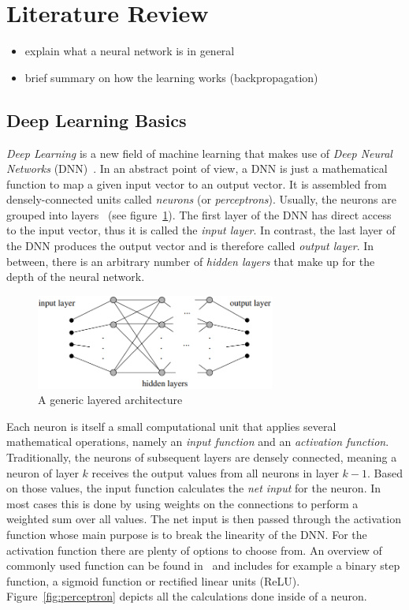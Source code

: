 \section{Literature Review}
\begin{itemize}
    \item explain what a neural network is in general
    \item brief summary on how the learning works (backpropagation)
\end{itemize}

\subsection{Deep Learning Basics}
\emph{Deep Learning} is a new field of machine learning that makes use of \emph{Deep Neural Networks} (DNN)~\cite[pp.~125f]{nn_intro96}. In an abstract point of view, a DNN is just a mathematical function to map a given input vector to an output vector. It is assembled from densely-connected units called \emph{neurons} (or \emph{perceptrons}). Usually, the neurons are grouped into layers~\cite[p.~125]{nn_intro96} (see figure~\ref{fig:layered_architecture}). The first layer of the DNN has direct access to the input vector, thus it is called the \emph{input layer}. In contrast, the last layer of the DNN produces the output vector and is therefore called \emph{output layer}. In between, there is an arbitrary number of \emph{hidden layers} that make up for the depth of the neural network.

\begin{figure}[h]
    \centering
    \includegraphics[width=0.7\textwidth]{images/generic_layered_architecture}
    \caption{A generic layered architecture~\cite[p.~126]{nn_intro96}}
    \label{fig:layered_architecture}
\end{figure}

Each neuron is itself a small computational unit that applies several mathematical operations, namely an \emph{input function} and an \emph{activation function}. Traditionally, the neurons of subsequent layers are densely connected, meaning a neuron of layer $k$ receives the output values from all neurons in layer $k-1$. Based on those values, the input function calculates the \emph{net input} for the neuron. In most cases this is done by using weights on the connections to perform a weighted sum over all values. The net input is then passed through the activation function whose main purpose is to break the linearity of the DNN. For the activation function there are plenty of options to choose from. An overview of commonly used function can be found in~\cite{act_funcs18} and includes for example a binary step function, a sigmoid function or rectified linear units (ReLU). Figure~\ref{fig:perceptron} depicts all the calculations done inside of a neuron.

